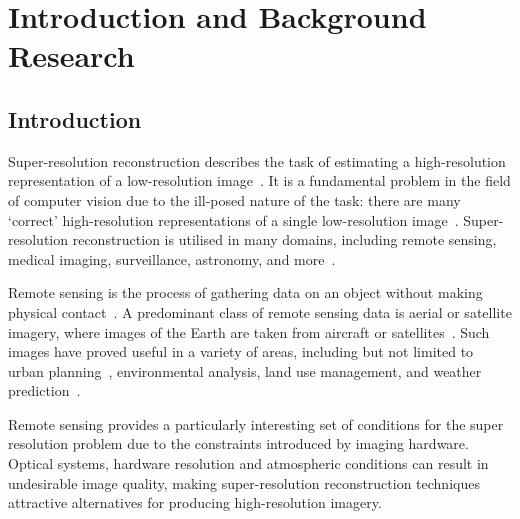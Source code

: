 \chapter{Introduction and Background Research}

\label{chapter1}

\section{Introduction}

Super-resolution reconstruction describes the task of estimating a high-resolution representation of a low-resolution image~\cite{superResOverview}. It is a fundamental problem in the field of computer vision due to the ill-posed nature of the task: there are many `correct' high-resolution representations of a single low-resolution image~\cite{superResChallenges,superResRemoteSensingOverview}. Super-resolution reconstruction is utilised in many domains, including remote sensing, medical imaging, surveillance, astronomy, and more~\cite{superResRemoteSensingChallenges, superResRemoteSensingOverview, superResMedicalImaging, superResSurveillance, superResAstronomy, superResUses}.

Remote sensing is the process of gathering data on an object without making physical contact~\cite{remoteSensing}. A predominant class of remote sensing data is aerial or satellite imagery, where images of the Earth are taken from aircraft or satellites~\cite{ref}. Such images have proved useful in a variety of areas, including but not limited to urban planning~\cite{remoteSensingUses}, environmental analysis, land use management, and weather prediction~\cite{remoteSensingGANsReview}.

Remote sensing provides a particularly interesting set of conditions for the super resolution problem due to the constraints introduced by imaging hardware. Optical systems, hardware resolution and atmospheric conditions can result in undesirable image quality, making super-resolution reconstruction techniques attractive alternatives for producing high-resolution imagery.

